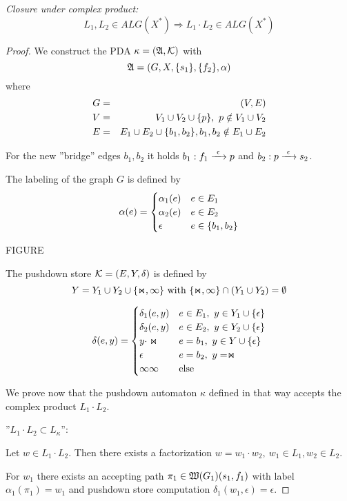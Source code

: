 {\em Closure under complex product:}
\[ L_1, L_2 \in ALG(X^*) \Rightarrow L_1 \cdot L_2 \in ALG(X^*) \]
\begin{proof}
We construct the PDA $\kappa = (\mbox{$\mathfrak{A}$}, \mbox{$\mathcal{K}$})$ with 
\[\mbox{$\mathfrak{A}$} = (G, X, \mbox{$\{s_1\}$}, \mbox{$\{f_2\}$}, \alpha)\]
where
\begin{eqnarray*}
G &=& (V, E) \\
V &=& V_1 \cup V_2 \cup \mbox{$\{p\}$},\ p \notin V_1 \cup V_2 \\
E &=& E_1 \cup E_2 \cup \mbox{$\{b_1, b_2\}$},b_1, b_2 \notin E_1 \cup E_2
\end{eqnarray*}

For the new ''bridge'' edges $b_1, b_2$ it holds $b_1: f_1 \xrightarrow{\ {\epsilon}\ } p$
and $b_2: p \xrightarrow{\ {\epsilon}\ } s_2$.

The labeling of the graph $G$ is defined by 
\[ \alpha(e) = \begin{cases} 
\alpha_1(e) 	& e \in E_1 \\
\alpha_2(e) 	& e \in E_2 \\
\epsilon 			& e \in \mbox{$\{b_1, b_2\}$} 
\end{cases}\]

FIGURE

The pushdown store $\mbox{$\mathcal{K}$} = (E, Y, \delta)$ is defined by
\[ Y = Y_1 \cup Y_2 \cup \mbox{$\{\Join, \infty\}$} \text{ with }\mbox{$\{\Join, \infty\}$} \cap
(Y_1 \cup Y_2) = \emptyset \]

\[ \delta(e, y) = \begin{cases}
\delta_1(e, y) 					& e \in E_1,\ y \in Y_1 \cup \mbox{$\{\epsilon\}$} \\
\delta_2(e, y) 					& e \in E_2,\ y \in Y_2 \cup \mbox{$\{\epsilon\}$} \\
y \cdot \Join 					& e = b_1,\ y \in Y \cup \mbox{$\{\epsilon\}$} \\
\epsilon 								& e = b_2,\ y = \Join \\
\infty\infty 						& \text{else}
\end{cases}\]

We prove now that the pushdown automaton $\kappa$ defined in that way accepts
the complex product $L_1 \cdot L_2$.

''$L_1 \cdot L_2 \subset L_{\kappa}$'':

Let $w \in L_1 \cdot L_2$. Then there exists a factorization $w = w_1 \cdot
w_2,\ w_1 \in L_1, w_2 \in L_2$.

For $w_1$ there exists an accepting path $\pi_1 \in \mbox{$\mathfrak{W}(G_1)$}(s_1,
f_1)$ with label $\alpha_1(\pi_1) = w_1$ and pushdown store computation
$\delta_1(w_1, \epsilon) = \epsilon$.


\end{proof}

